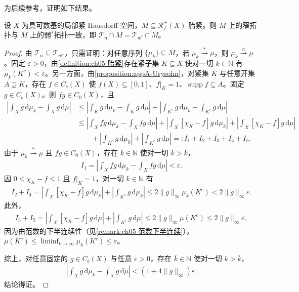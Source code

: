 \documentclass[../../main.tex]{subfiles}%
\begin{document}
为后续参考，证明如下结果。

\begin{proposition}\label{proposition:ch05-胎紧拓扑一致}
设 $X$ 为具可数基的局部紧 Hausdorff 空间，$M\subseteq\mathscr{R}^+_f(X)$ 胎紧。则 $M$ 上的窄拓扑与 $M$ 上的弱$^*$拓扑一致，即 $\mathcal{T}_n\cap M=\mathcal{T}_{w^*}\cap M$。
\end{proposition}

\begin{proof}
由 $\mathcal{T}_n\subseteq\mathcal{T}_{w^*}$，只需证明：对任意序列 $\{\mu_k\}\subseteq M$，若 $\mu_k\stackrel{*}{\rightharpoonup}\mu$，则 $\mu_k\stackrel{n}{\rightharpoonup}\mu$。固定 $\varepsilon>0$，由\cref{definition:ch05-胎紧}存在紧子集 $K\subseteq X$ 使对一切 $k\in\mathbb{N}$ 有 $\mu_k(K^c)<\varepsilon$。另一方面，由\cref{proposition:appA-Urysohn}，对紧集 $K$ 与任意开集 $A\supseteq K$，存在 $f\in C_c(X)$ 使 $f(X)\subseteq[0,1]$、$f|_K=1$、$\operatorname{supp}f\subseteq A$。固定 $g\in C_b(X)$。则 $fg\in C_0(X)$，且
\begin{align*}
\left|\int_X g\,\mathrm{d}\mu_k-\int_X g\,\mathrm{d}\mu\right|
&\leqslant\left|\int_K g\,\mathrm{d}\mu_k-\int_K g\,\mathrm{d}\mu\right|
+\left|\int_{K^c}g\,\mathrm{d}\mu_k-\int_{K^c}g\,\mathrm{d}\mu\right|\\
&\leqslant\left|\int_X fg\,\mathrm{d}\mu_k-\int_X fg\,\mathrm{d}\mu\right|
+\left|\int_X[\chi_K-f]g\,\mathrm{d}\mu_k\right|
+\left|\int_X[\chi_K-f]g\,\mathrm{d}\mu\right|\\
&\qquad+\left|\int_{K^c}g\,\mathrm{d}\mu_k\right|
+\left|\int_{K^c}g\,\mathrm{d}\mu\right|
=:I_1+I_2+I_3+I_4+I_5 .
\end{align*}
由于 $\mu_k\stackrel{*}{\rightharpoonup}\mu$ 且 $fg\in C_0(X)$，存在 $\bar{k}\in\mathbb{N}$ 使对一切 $k>\bar{k}$，
\begin{align*}
I_1=\left|\int_X fg\,\mathrm{d}\mu_k-\int_X fg\,\mathrm{d}\mu\right|<\varepsilon.
\end{align*}
因 $0\leqslant\chi_K-f\leqslant1$ 且 $f|_K=1$，对一切 $k\in\mathbb{N}$ 有
\begin{align*}
I_2+I_4
=\left|\int_X[\chi_K-f]g\,\mathrm{d}\mu_k\right|
+\left|\int_{K^c}g\,\mathrm{d}\mu_k\right|
\leqslant 2\|g\|_\infty\mu_k(K^c)<2\|g\|_\infty\varepsilon.
\end{align*}
此外，
\begin{align*}
I_3+I_5
=\left|\int_X[\chi_K-f]g\,\mathrm{d}\mu\right|
+\left|\int_{K^c}g\,\mathrm{d}\mu\right|
\leqslant 2\|g\|_\infty\mu(K^c)\leqslant 2\|g\|_\infty\varepsilon,
\end{align*}
因为由范数的下半连续性（见\cref{remark:ch05-范数下半连续}），$\mu(K^c)\leqslant\liminf_{k\to\infty}\mu_k(K^c)\leqslant\varepsilon$。

综上，对任意固定的 $g\in C_b(X)$ 与任意 $\varepsilon>0$，存在 $\bar{k}\in\mathbb{N}$ 使对一切 $k>\bar{k}$，
\begin{align*}
\left|\int_X g\,\mathrm{d}\mu_k-\int_X g\,\mathrm{d}\mu\right|<(1+4\|g\|_\infty)\varepsilon.
\end{align*}
结论得证。
\end{proof}
\end{document}
